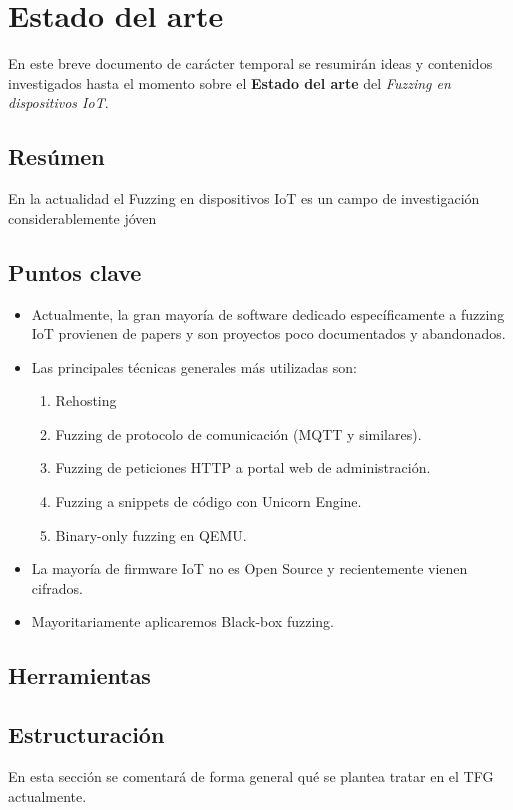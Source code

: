 \documentclass[11pt, a4paper, openany]{book}
\begin{document}
	\chapter{Estado del arte}

    En este breve documento de carácter temporal se resumirán ideas y contenidos investigados 
    hasta el momento sobre el \textbf{Estado del arte} del \textit{Fuzzing en dispositivos IoT}.

    \section{Resúmen}
    En la actualidad el Fuzzing en dispositivos IoT es un campo de investigación considerablemente
    jóven

    \section{Puntos clave}
    \begin{itemize}
        \item Actualmente, la gran mayoría de software dedicado específicamente a fuzzing IoT 
        provienen de papers y son proyectos poco documentados y abandonados.
        \item Las principales técnicas generales más utilizadas son:
        \begin{enumerate}
            \item Rehosting
            \item Fuzzing de protocolo de comunicación (MQTT y similares).
            \item Fuzzing de peticiones HTTP a portal web de administración.
            \item Fuzzing a snippets de código con Unicorn Engine.
            \item Binary-only fuzzing en QEMU.
        \end{enumerate}
        \item La mayoría de firmware IoT no es Open Source y recientemente vienen cifrados.
        \item Mayoritariamente aplicaremos Black-box fuzzing.
    \end{itemize}

    \section{Herramientas}

    \section{Estructuración}
    En esta sección se comentará de forma general qué se plantea tratar en el TFG actualmente.
    
\end{document}
